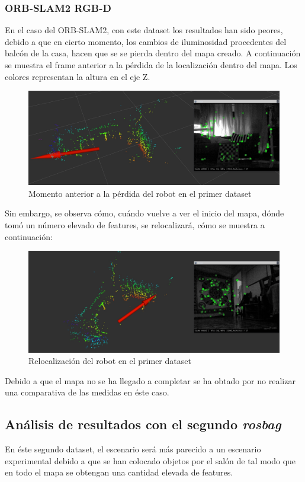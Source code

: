 \subsubsection{ORB-SLAM2 RGB-D}
En el caso del ORB-SLAM2, con este dataset los resultados han sido peores, debido a que en cierto momento, los cambios de iluminosidad procedentes del balcón de la casa, hacen que se
se pierda dentro del mapa creado. A continuación se muestra el frame anterior a la pérdida de la localización dentro del mapa. Los colores representan la altura en el eje Z.
\begin{figure}[h!]
    \centering
    \includegraphics[width=.9\textwidth]{images/slam/bag1_orb_beforeLOSE}
    \caption{Momento anterior a la pérdida del robot en el primer dataset}
\end{figure}

Sin embargo, se observa cómo, cuándo vuelve a ver el inicio del mapa, dónde tomó un número elevado de features, se relocalizará, cómo se muestra a continuación:
\begin{figure}[h!]
    \centering
    \includegraphics[width=.9\textwidth]{images/slam/bag1_orb_relocal}
    \caption{Relocalización del robot en el primer dataset}
\end{figure}

Debido a que el mapa no se ha llegado a completar se ha obtado por no realizar una comparativa de las medidas en éste caso.

\newpage

\subsection{Análisis de resultados con el segundo \textit{rosbag}}
En éste segundo dataset, el escenario será más parecido a un escenario experimental debido a que se han colocado objetos por el salón de tal modo que en todo el mapa se
obtengan una cantidad elevada de features.

